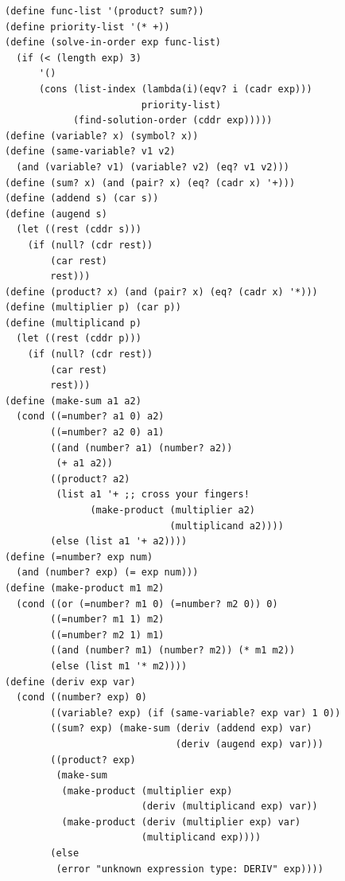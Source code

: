\documentclass[final,fleqn,titlepage,twoside]{article}
\begin{document}
\begin{verbatim}
(define func-list '(product? sum?))
(define priority-list '(* +))
(define (solve-in-order exp func-list)
  (if (< (length exp) 3)
      '()
      (cons (list-index (lambda(i)(eqv? i (cadr exp)))
                        priority-list)
            (find-solution-order (cddr exp)))))
(define (variable? x) (symbol? x))
(define (same-variable? v1 v2)
  (and (variable? v1) (variable? v2) (eq? v1 v2)))
(define (sum? x) (and (pair? x) (eq? (cadr x) '+)))
(define (addend s) (car s))
(define (augend s)
  (let ((rest (cddr s)))
    (if (null? (cdr rest))
        (car rest)
        rest)))
(define (product? x) (and (pair? x) (eq? (cadr x) '*)))
(define (multiplier p) (car p))
(define (multiplicand p)
  (let ((rest (cddr p)))
    (if (null? (cdr rest))
        (car rest)
        rest)))
(define (make-sum a1 a2)
  (cond ((=number? a1 0) a2)
        ((=number? a2 0) a1)
        ((and (number? a1) (number? a2))
         (+ a1 a2))
        ((product? a2)
         (list a1 '+ ;; cross your fingers!
               (make-product (multiplier a2)
                             (multiplicand a2))))
        (else (list a1 '+ a2))))
(define (=number? exp num)
  (and (number? exp) (= exp num)))
(define (make-product m1 m2)
  (cond ((or (=number? m1 0) (=number? m2 0)) 0)
        ((=number? m1 1) m2)
        ((=number? m2 1) m1)
        ((and (number? m1) (number? m2)) (* m1 m2))
        (else (list m1 '* m2))))
(define (deriv exp var)
  (cond ((number? exp) 0)
        ((variable? exp) (if (same-variable? exp var) 1 0))
        ((sum? exp) (make-sum (deriv (addend exp) var)
                              (deriv (augend exp) var)))
        ((product? exp)
         (make-sum
          (make-product (multiplier exp)
                        (deriv (multiplicand exp) var))
          (make-product (deriv (multiplier exp) var)
                        (multiplicand exp))))
        (else
         (error "unknown expression type: DERIV" exp))))
\end{verbatim}
\end{document}
